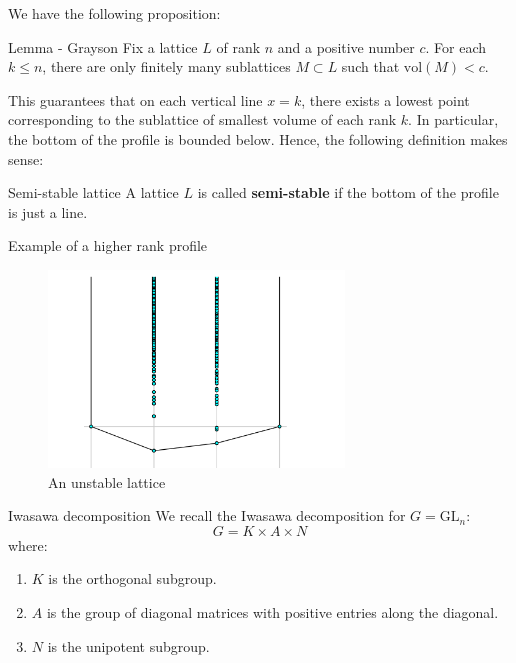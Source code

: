 \documentclass[pdf]{beamer}
\begin{document}
\begin{frame}
    We have the following proposition:
    \begin{block}{Lemma - Grayson}
        Fix a lattice $L$ of rank $n$ and a positive number $c$. For each $k \leq n$, there are only finitely many sublattices $M \subset L$ such that
        $\text{vol}(M) < c$.
    \end{block} \pause

    This guarantees that on each vertical line $x = k$, there exists a lowest point corresponding to the sublattice of smallest volume of each rank $k$.
    In particular, the bottom of the profile is bounded below. Hence, the following definition makes sense: \pause
    \begin{block}{Semi-stable lattice}
        A lattice $L$ is called \textbf{semi-stable} if the bottom of the profile is just a line.
    \end{block}
\end{frame}
\begin{frame}{Example of a higher rank profile}
    \centering
    \begin{figure}
        \includegraphics[width = 0.7\textwidth]{Canonical plot 3 dim.png}
        \caption{An unstable lattice}
    \end{figure}
\end{frame}
\begin{frame}{Iwasawa decomposition}
    We recall the Iwasawa decomposition for $G = \text{GL}_n$:
    \[G = K \times A \times N\]
    where:
    \begin{enumerate}
        \item $K$ is the orthogonal subgroup.
        \item $A$ is the group of diagonal matrices with positive entries along the diagonal.
        \item $N$ is the unipotent subgroup.
    \end{enumerate}
\end{frame}
\end{document}
